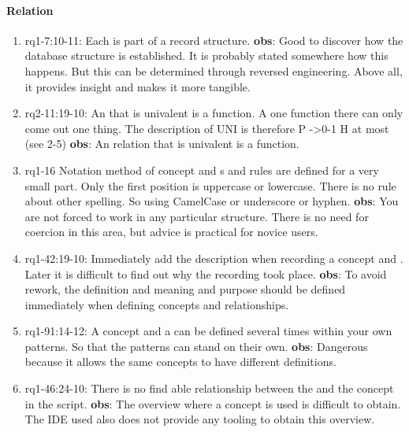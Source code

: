 \paragraph{Relation}
\begin{enumerate}
    \item rq1-7:10-11: Each  is part of a record structure.
    \newline\textbf{obs}: Good to discover how the database structure is established.
    It is probably stated somewhere how this happens.
    But this can be determined through reversed engineering.
    Above all, it provides insight and makes it more tangible.

    \item rq2-11:19-10: An  that is univalent is a function.
    A one function there can only come out one thing.
    The description of UNI is therefore P ->0-1 H at most (see 2-5)
    \newline\textbf{obs}: An relation that is univalent is a function.
    
    \item rq1-16 Notation method of {concept} and s and {rule}s are defined for a very small part.
    Only the first position is uppercase or lowercase.
    There is no rule about other spelling.
    So using CamelCase or underscore or hyphen.
    \newline\textbf{obs}: You are not forced to work in any particular structure.
    There is no need for coercion in this area, but advice is practical for novice users.

    \item rq1-42:19-10: Immediately add the description when recording a {concept} and .
    Later it is difficult to find out why the recording took place.
    \newline\textbf{obs}: To avoid rework, the definition and meaning and purpose should be defined immediately when defining concepts and relationships.
    
    \item rq1-91:14-12: A {concept} and a  can be defined several times within your own patterns.
    So that the patterns can stand on their own.
    \newline\textbf{obs}: Dangerous because it allows the same concepts to have different definitions.

    \item rq1-46:24-10: There is no find able relationship between the  and the {concept} in the script.
    \newline\textbf{obs}: The {overview} where a concept is used is difficult to obtain.
    The IDE used also does not provide any tooling to obtain this overview.

\end{enumerate}


